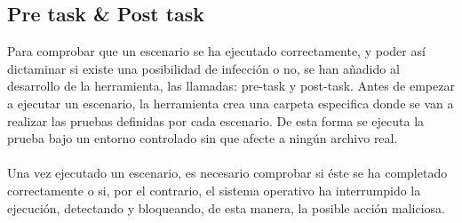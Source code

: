 \documentclass[a4paper,12pt]{article}
\begin{document}
\subsection{Pre task \& Post task}
Para comprobar que un escenario se ha ejecutado correctamente, y poder así dictaminar si existe una posibilidad de infección o no, se han añadido al desarrollo de la herramienta, las llamadas: pre-task y post-task. Antes de empezar a ejecutar un escenario, la herramienta crea una carpeta especifica donde se van a realizar las pruebas definidas por cada escenario. De esta forma se ejecuta la prueba bajo un entorno controlado sin que afecte a ningún archivo real.\\\\
Una vez ejecutado un escenario, es necesario comprobar si éste se ha completado correctamente o si, por el contrario, el sistema operativo ha interrumpido la ejecución, detectando y bloqueando, de esta manera, la posible acción maliciosa.  
\end{document}
